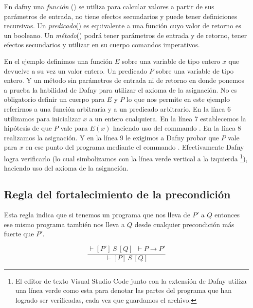 \documentclass[12pt, a4paper, openany, fleqn]{book}
\newcommand{\hoareTheorem}[3]{\ensuremath{\vdash[#1]\ #2\ [#3]}}
\newcommand{\inferenceRule}[2]{
    \begin{equation*}
        \frac{#1}{#2}
    \end{equation*}
}
\begin{document}
    En dafny una \textit{función} () se utiliza para calcular valores a partir de sus parámetros de entrada, no tiene efectos secundarios y puede tener definiciones recursivas. Un \textit{predicado}() es equivalente a una función cuyo valor de retorno es un booleano. Un \textit{método}() podrá tener parámetros de entrada y de retorno, tener efectos secundarios y utilizar en su cuerpo comandos imperativos.

    En el ejemplo definimos una función $E$ sobre una variable de tipo entero $x$ que devuelve a su vez un valor entero.
    Un predicado $P$ sobre una variable de tipo entero.
    Y un método sin parámetros de entrada ni de retorno en donde ponemos a prueba la habilidad de Dafny para utilizar el axioma de la asignación.
    No es obligatorio definir un cuerpo para $E$ y $P$ lo que nos permite en este ejemplo referirnos a una función arbitraria y a un predicado arbitrario.
    En la línea 6 utilizamos  para inicializar $x$ a un entero cualquiera.
    En la línea 7 establecemos la hipótesis de que $P$ vale para $E(x)$ haciendo uso del commando .
    En la línea 8 realizamos la asignación.
    Y en la línea 9 le exigimos a Dafny probar que $P$ vale para $x$ en ese punto del programa mediante el commando .
    Efectivamente Dafny logra verificarlo (lo cual simbolizamos con la línea verde vertical a la izquierda \footnote{El editor de texto Visual Studio Code junto con la extensión de Dafny utiliza una línea verde como esta para denotar las partes del programa que han logrado ser verificadas, cada vez que guardamos el archivo.}), haciendo uso del axioma de la asignación.

    \subsection{Regla del fortalecimiento de la precondición}
    Esta regla indica que si tenemos un programa que nos lleva de $P'$ a $Q$ entonces ese mismo programa también nos lleva a $Q$ desde cualquier precondición más fuerte que $P'$.
    \inferenceRule{\hoareTheorem{P'}{S}{Q}\ \ \vdash P \rightarrow P'}{\hoareTheorem{P}{S}{Q}}
\end{document}

